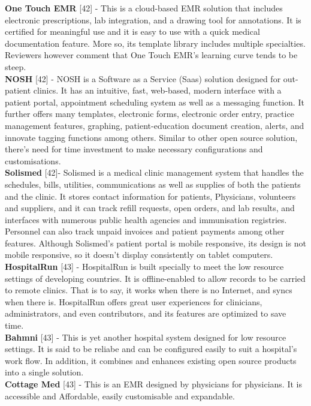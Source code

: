 \documentclass[a4paper]{article}
\begin{document}
{\bf One Touch EMR} [42] - This is a cloud-based EMR solution that includes electronic prescriptions, lab integration, and a drawing tool for annotations. It is certified for meaningful use and it is easy to use with a quick medical documentation feature. More so, its template library includes multiple specialties. Reviewers however comment that One Touch EMR's learning curve tends to be steep.\\
{\bf NOSH} [42] - NOSH is a Software as a Service (Saas) solution designed for out-patient clinics. It has an intuitive, fast, web-based, modern interface with a patient portal, appointment scheduling system as well as a messaging function. It further offers many templates, electronic forms, electronic order entry, practice management features, graphing, patient-education document creation, alerts, and innovate tagging functions among others. Similar to other open source solution, there’s need for time investment to make necessary configurations and customisations. \\
{\bf Solismed} [42]- Solismed is a medical clinic management system that handles the schedules, bills, utilities, communications as well as supplies of both the patients and the clinic. It stores contact information for patients, Physicians, volunteers and suppliers, and it can track refill requests, open orders, and lab results, and interfaces with numerous public health agencies and immunisation registries. Personnel can also track unpaid invoices and patient payments among other features. Although Solismed’s patient portal is mobile responsive,  its design is not mobile responsive, so it doesn’t display consistently on tablet computers.\\
{\bf HospitalRun} [43] - HospitalRun is built specially to meet the low resource settings of developing countries. It is offline-enabled to allow records to be carried to remote clinics. That is to say, it works when there is no Internet, and syncs when there is. HospitalRun offers great user experiences for clinicians, administrators, and even contributors, and its features are optimized to save time.\\
{\bf Bahmni} [43] - This is yet another hospital system designed for low resource settings. It is said to be reliabe and can be configured easily to suit a hospital's work flow. In addition, it combines and enhances existing open source products into a single solution.\\
{\bf Cottage Med} [43] - This is an EMR designed by physicians for physicians. It is accessible and Affordable, easily customisable and expandable.\\ \\
\end{document}
